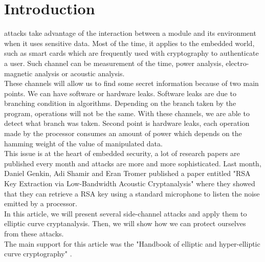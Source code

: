 \documentclass[journal]{IEEEtran}
\begin{document}
\section{Introduction}

 attacks take advantage of the interaction between a module and its environment when it uses sensitive data. Most of the time, it applies to the embedded world, such as smart cards which are frequently used with cryptography to authenticate a user. Such channel can be measurement of the time, power analysis, electro-magnetic analysis or acoustic analysis.\\

These channels will allow us to find some secret information because of two main points. We can have software or hardware leaks. Software leaks are due to branching condition in algorithms. Depending on the branch taken by the program, operations will not be the same. With these channels, we are able to detect what branch was taken. Second point is hardware leaks, each operation made by the processor consumes an amount of power which depends on the hamming weight of the value of manipulated data.\\

This issue is at the heart of embedded security, a lot of research papers are published every month and attacks are more and more sophisticated. Last month, Daniel Genkin, Adi Shamir and Eran Tromer published a paper entitled "RSA Key Extraction via Low-Bandwidth Acoustic Cryptanalysis"\cite{genkin2013rsa} where they showed that they can retrieve a RSA key using a standard microphone to listen the noise emitted by a processor.\\

In this article, we will present several side-channel attacks and apply them to elliptic curve cryptanalysis. Then, we will show how we can protect ourselves from these attacks.\\

The main support for this article was the "Handbook of elliptic and hyper-elliptic curve cryptography" \cite{cohen2010handbook}.



\end{document}
